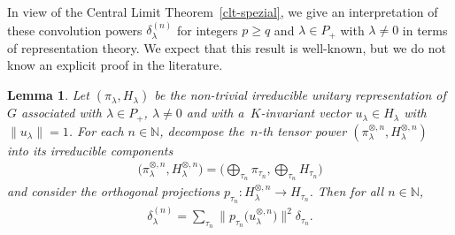 \documentclass[pdftex]{sigma}
\numberwithin{equation}{section}
\newtheorem{Lemma}[Theorem]{Lemma}
\begin{document}
In view of the Central Limit Theorem~\ref{clt-spezial}, we give an interpretation of these convolution powers
$\delta_\lambda^{(n)}$ for integers $p\ge q$ and $\lambda\in P_+$ with $\lambda\ne 0$ in terms of representation theory.
We expect that this result is well-known, but we do not know an explicit proof in the literature.

\begin{Lemma}
\label{potenzen-tensoren}
Let $(\pi_\lambda,H_\lambda)$ be the non-trivial irreducible unitary representation of~$G$ associated with $\lambda\in
P_+$, $\lambda\ne0$ and with a~$K$-invariant vector $u_\lambda\in H_\lambda$ with $\|u_\lambda\|=1$.
For each $n\in \mathbb N$, decompose the~$n$-th tensor power $(\pi_\lambda^{\otimes, n},H_\lambda^{\otimes, n})$ into
its irreducible components
\begin{gather}
\label{tensor-zerl}
\big(\pi_\lambda^{\otimes, n},H_\lambda^{\otimes, n}\big)=\bigg(\bigoplus_{\tau_n}\pi_{\tau_n}, \bigoplus_{\tau_n} H_{\tau_n}\bigg)
\end{gather}
and consider the orthogonal projections $p_{\tau_n}:H_\lambda^{\otimes, n}\to H_{\tau_n}$.
Then for all $n\in\mathbb N$,
\begin{gather*}
\delta_\lambda^{(n)}= \sum\limits_{\tau_n}\big\|p_{\tau_n}\big(u_\lambda^{\otimes, n}\big)\big\|^2 \delta_{\tau_n}.
\end{gather*}
\end{Lemma}
\end{document}
